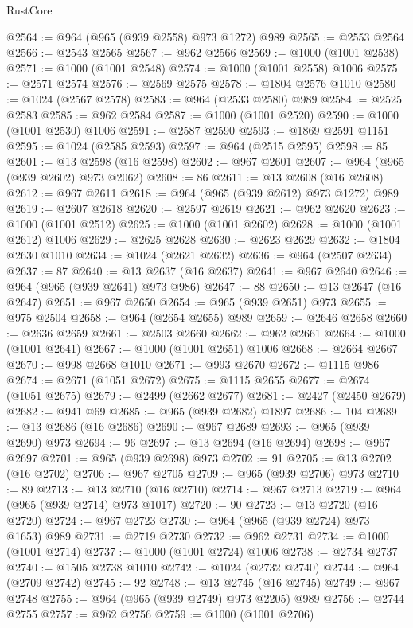 \begin{lexlean}{RustCore}
\begin{coremodule}
@2564 := @964 (@965 (@939 @2558) @973 @1272) @989
@2565 := @2553 @2564
@2566 := @2543 @2565
@2567 := @962 @2566
@2569 := @1000 (@1001 @2538)
@2571 := @1000 (@1001 @2548)
@2574 := @1000 (@1001 @2558) @1006
@2575 := @2571 @2574
@2576 := @2569 @2575
@2578 := @1804 @2576 @1010
@2580 := @1024 (@2567 @2578)
@2583 := @964 (@2533 @2580) @989
@2584 := @2525 @2583
@2585 := @962 @2584
@2587 := @1000 (@1001 @2520)
@2590 := @1000 (@1001 @2530) @1006
@2591 := @2587 @2590
@2593 := @1869 @2591 @1151
@2595 := @1024 (@2585 @2593)
@2597 := @964 (@2515 @2595)
@2598 := 85
@2601 := @13 @2598 (@16 @2598)
@2602 := @967 @2601
@2607 := @964 (@965 (@939 @2602) @973 @2062)
@2608 := 86
@2611 := @13 @2608 (@16 @2608)
@2612 := @967 @2611
@2618 := @964 (@965 (@939 @2612) @973 @1272) @989
@2619 := @2607 @2618
@2620 := @2597 @2619
@2621 := @962 @2620
@2623 := @1000 (@1001 @2512)
@2625 := @1000 (@1001 @2602)
@2628 := @1000 (@1001 @2612) @1006
@2629 := @2625 @2628
@2630 := @2623 @2629
@2632 := @1804 @2630 @1010
@2634 := @1024 (@2621 @2632)
@2636 := @964 (@2507 @2634)
@2637 := 87
@2640 := @13 @2637 (@16 @2637)
@2641 := @967 @2640
@2646 := @964 (@965 (@939 @2641) @973 @986)
@2647 := 88
@2650 := @13 @2647 (@16 @2647)
@2651 := @967 @2650
@2654 := @965 (@939 @2651) @973
@2655 := @975 @2504
@2658 := @964 (@2654 @2655) @989
@2659 := @2646 @2658
@2660 := @2636 @2659
@2661 := @2503 @2660
@2662 := @962 @2661
@2664 := @1000 (@1001 @2641)
@2667 := @1000 (@1001 @2651) @1006
@2668 := @2664 @2667
@2670 := @998 @2668 @1010
@2671 := @993 @2670
@2672 := @1115 @986
@2674 := @2671 (@1051 @2672)
@2675 := @1115 @2655
@2677 := @2674 (@1051 @2675)
@2679 := @2499 (@2662 @2677)
@2681 := @2427 (@2450 @2679)
@2682 := @941 @69
@2685 := @965 (@939 @2682) @1897
@2686 := 104
@2689 := @13 @2686 (@16 @2686)
@2690 := @967 @2689
@2693 := @965 (@939 @2690) @973
@2694 := 96
@2697 := @13 @2694 (@16 @2694)
@2698 := @967 @2697
@2701 := @965 (@939 @2698) @973
@2702 := 91
@2705 := @13 @2702 (@16 @2702)
@2706 := @967 @2705
@2709 := @965 (@939 @2706) @973
@2710 := 89
@2713 := @13 @2710 (@16 @2710)
@2714 := @967 @2713
@2719 := @964 (@965 (@939 @2714) @973 @1017)
@2720 := 90
@2723 := @13 @2720 (@16 @2720)
@2724 := @967 @2723
@2730 := @964 (@965 (@939 @2724) @973 @1653) @989
@2731 := @2719 @2730
@2732 := @962 @2731
@2734 := @1000 (@1001 @2714)
@2737 := @1000 (@1001 @2724) @1006
@2738 := @2734 @2737
@2740 := @1505 @2738 @1010
@2742 := @1024 (@2732 @2740)
@2744 := @964 (@2709 @2742)
@2745 := 92
@2748 := @13 @2745 (@16 @2745)
@2749 := @967 @2748
@2755 := @964 (@965 (@939 @2749) @973 @2205) @989
@2756 := @2744 @2755
@2757 := @962 @2756
@2759 := @1000 (@1001 @2706)

\end{coremodule}
\end{lexlean}
